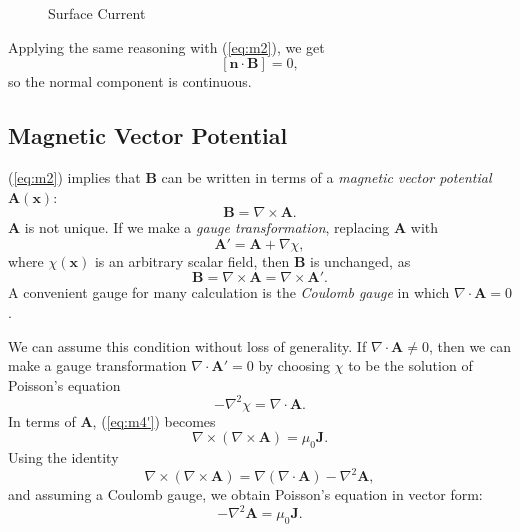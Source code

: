\documentclass[12pt]{article}
\begin{document}
\begin{figure}[h]
	\centering
	\caption{Surface Current}
	\label{fig:surface_current}
\end{figure}

Applying the same reasoning with (\ref{eq:m2}), we get
\[
	[\mathbf{n} \cdot \mathbf{B}] = 0
,\]
so the normal component is continuous.

\subsection{Magnetic Vector Potential}
\label{sub:magnetic_vector_potential}

(\ref{eq:m2}) implies that $\mathbf{B}$ can be written in terms of a \emph{magnetic vector potential} $\mathbf{A}(\mathbf{x})$:
\[
\mathbf{B} = \nabla \times \mathbf{A}
.\]
$\mathbf{A}$ is not unique. If we make a \emph{gauge transformation}, replacing $\mathbf{A}$ with
\[
\mathbf{A}' = \mathbf{A} + \nabla \chi
,\]
where $\chi(\mathbf{x})$ is an arbitrary scalar field, then $\mathbf{B}$ is unchanged, as
\[
\mathbf{B} = \nabla \times \mathbf{A} = \nabla \times \mathbf{A}'
.\]
A convenient gauge for many calculation is the \emph{Coulomb gauge} in which $\nabla \cdot \mathbf{A} = 0$.

We can assume this condition without loss of generality. If $\nabla \cdot \mathbf{A} \neq 0$, then we can make a gauge transformation $\nabla \cdot \mathbf{A}' = 0$ by choosing $\chi$ to be the solution of Poisson's equation
\[
- \nabla^2 \chi = \nabla \cdot \mathbf{A}
.\]
In terms of $\mathbf{A}$, (\ref{eq:m4'}) becomes
\[
\nabla \times (\nabla \times \mathbf{A}) = \mu_0 \mathbf{J}
.\]
Using the identity
\[
	\nabla \times (\nabla \times \mathbf{A}) = \nabla (\nabla \cdot \mathbf{A}) - \nabla^2 \mathbf{A}
,\]
and assuming a Coulomb gauge, we obtain Poisson's equation in vector form:
\[
- \nabla^2 \mathbf{A} = \mu_0 \mathbf{J}
.\]
\end{document}
